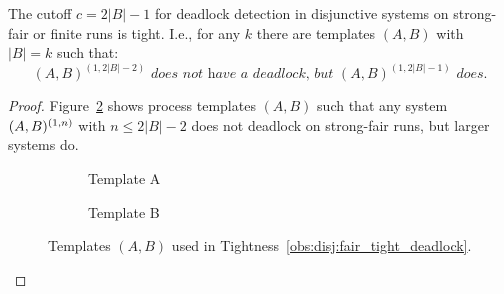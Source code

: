 \begin{tightness}
\label{obs:disj:fair_tight_deadlock}
The cutoff $c=2|B|-1$ for deadlock detection in disjunctive systems on strong-fair or finite runs is tight.
I.e., for any $k$ there are templates $(A,B)$ with $|B|=k$ such that:
$$
(A,B)^{(1,2|B|-2)} \textit{ does not have a deadlock, but } (A,B)^{(1,2|B|-1)} \textit { does}.
$$
\end{tightness}
\begin{proof}
Figure~\ref{gua:fig:tight_disj_dead_fair}
shows process templates $(A,B)$ such that any system $(A,B)^{(1,n)}$ with $n\leq 2|B|-2$ does not deadlock on strong-fair runs, but larger systems do.
% 
\begin{figure}[htpb]
\centering
\begin{subfigure}[b]{0.45\textwidth}\center
\scalebox{0.75}{}
\label{fig:disj:tight_fair_deadlock_tmplA}
\caption*{Template A}
\end{subfigure}
\begin{subfigure}[b]{0.45\textwidth}\center
\scalebox{0.75}{}
\caption*{Template B}
\end{subfigure}
\caption{Templates $(A,B)$ used in Tightness~\ref{obs:disj:fair_tight_deadlock}.}
\label{gua:fig:tight_disj_dead_fair}
\end{figure}
% 
\end{proof}
